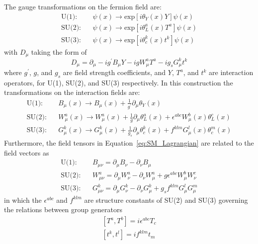 The gauge transformations on the fermion field are:
\begin{equation}\label{eq:gauge_fermion}
  \begin{split}
    \text{U(1)}:  & ~~~~ \psi(x) \to  \text{exp}[i\theta_{Y}(x)Y]\psi(x) \\
    \text{SU(2)}: & ~~~~ \psi(x) \to  \text{exp}[i\theta^{a}_{L}(x)T^{a}]\psi(x) \\
    \text{SU(3)}: & ~~~~ \psi(x) \to  \text{exp}[i\theta^{k}_{c}(x)t^{k}]\psi(x) 
  \end{split}  
\end{equation}  
with $D_{\mu}$ taking the form of 
\begin{equation}\label{eq:SM_cov_dev}
  D_{\mu} = \partial_{\mu} - ig^{\prime}B_{\mu}Y - igW^{a}_{\mu}T^{a} - ig_{s}G^{k}_{\mu}t^{k}
\end{equation} 
where $g^{\prime}$, $g$, and $g_{s}$ are field strength coefficients, 
and $Y$, $T^{a}$, and $t^{k}$ are interaction operators, for U(1), SU(2), and SU(3) respectively.
In this construction the transformations on the interaction fields are:
\begin{equation}\label{eq:gauge_interaction}
  \begin{split}
    \text{U(1)}:  & ~~~~  B_{\mu}(x) \to B_{\mu}(x) + \frac{1}{g^{\prime}}\partial_{\mu}\theta_{Y}(x) \\
    \text{SU(2)}: & ~~~~  W^{a}_{\mu}(x) \to  W^{a}_{\mu}(x) + \frac{1}{g}\partial_{\mu}\theta^{a}_{L}(x) + \epsilon^{abc}W^{b}_{\mu}(x)\theta^{c}_{L}(x) \\
    \text{SU(3)}: & ~~~~  G^{k}_{\mu}(x) \to  G^{k}_{\mu}(x) + \frac{1}{g_{s}}\partial_{\mu}\theta^{k}_{c}(x) + f^{klm}G^{l}_{\mu}(x)\theta^{m}_{c}(x)
  \end{split}  
\end{equation}  
Furthermore, the field tensors in Equation~\ref{eq:SM_Lagrangian} are related to the field vectors as
\begin{equation}\label{eq:field_tensor}
  \begin{split}
    \text{U(1)}:  & ~~~~ B_{\mu\nu} = \partial_{\mu}B_{\nu} - \partial_{\nu}B_{\mu} \\
    \text{SU(2)}: & ~~~~ W^{a}_{\mu\nu} = \partial_{\mu}W^{a}_{\nu} - \partial_{\nu}W^{a}_{\mu} + g\epsilon^{abc}W^{b}_{\mu}W^{c}_{\nu} \\
    \text{SU(3)}: & ~~~~ G^{k}_{\mu\nu} = \partial_{\mu}G^{k}_{\nu} - \partial_{\nu}G^{k}_{\mu} + g_{s} f^{klm}G^{l}_{\mu}G^{m}_{\mu} 
  \end{split}
\end{equation}
in which the $\epsilon^{abc}$ and $f^{klm}$ are structure constants of SU(2) and SU(3) governing the relations between group generators
\begin{equation}\label{eq:struture_constant}
  \begin{split}
    [T^{a}, T^{b}] = i\epsilon^{abc}T_{c} \\
    [t^{k}, t^{l}] = if^{klm}t_{m}
  \end{split}
\end{equation}


